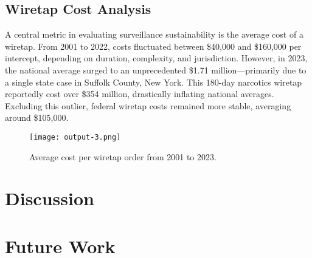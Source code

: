 \documentclass[11pt,twocolumn]{article} %
\begin{document}
\subsection{Wiretap Cost Analysis}
A central metric in evaluating surveillance sustainability is the average cost of a wiretap. From 2001 to 2022, costs fluctuated between \$40,000 and \$160,000 per intercept, depending on duration, complexity, and jurisdiction. However, in 2023, the national average surged to an unprecedented \$1.71 million—primarily due to a single state case in Suffolk County, New York. This 180-day narcotics wiretap reportedly cost over \$354 million, drastically inflating national averages. Excluding this outlier, federal wiretap costs remained more stable, averaging around \$105,000.\\

\begin{figure}[h!]
\centering
\texttt{[image: output-3.png]}
\caption{Average cost per wiretap order from 2001 to 2023.}
\label{fig:costgraph}
\end{figure}

\section{Discussion}

\section{Future Work}
\end{document}
